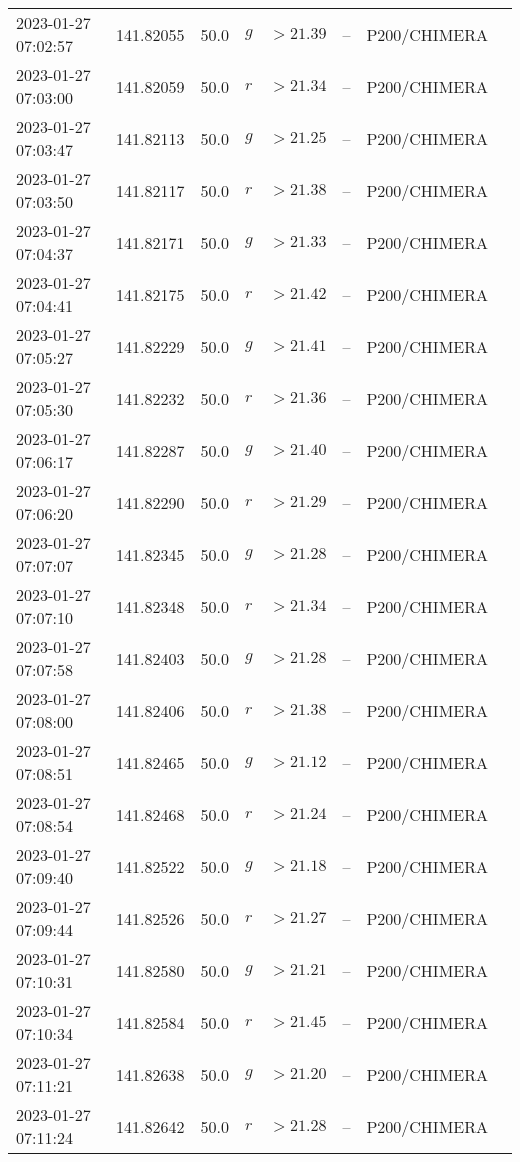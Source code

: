 \documentclass{nature_plusfigure}
\begin{document}
\begin{supplement}
\begin{center}
\begin{longtable}{llllllll}
2023-01-27 07:02:57 & 141.82055 & 50.0 & $g$ & $>21.39$ & -- & P200/CHIMERA &  \\ 
2023-01-27 07:03:00 & 141.82059 & 50.0 & $r$ & $>21.34$ & -- & P200/CHIMERA &  \\ 
2023-01-27 07:03:47 & 141.82113 & 50.0 & $g$ & $>21.25$ & -- & P200/CHIMERA &  \\ 
2023-01-27 07:03:50 & 141.82117 & 50.0 & $r$ & $>21.38$ & -- & P200/CHIMERA &  \\ 
2023-01-27 07:04:37 & 141.82171 & 50.0 & $g$ & $>21.33$ & -- & P200/CHIMERA &  \\ 
2023-01-27 07:04:41 & 141.82175 & 50.0 & $r$ & $>21.42$ & -- & P200/CHIMERA &  \\ 
2023-01-27 07:05:27 & 141.82229 & 50.0 & $g$ & $>21.41$ & -- & P200/CHIMERA &  \\ 
2023-01-27 07:05:30 & 141.82232 & 50.0 & $r$ & $>21.36$ & -- & P200/CHIMERA &  \\ 
2023-01-27 07:06:17 & 141.82287 & 50.0 & $g$ & $>21.40$ & -- & P200/CHIMERA &  \\ 
2023-01-27 07:06:20 & 141.82290 & 50.0 & $r$ & $>21.29$ & -- & P200/CHIMERA &  \\ 
2023-01-27 07:07:07 & 141.82345 & 50.0 & $g$ & $>21.28$ & -- & P200/CHIMERA &  \\ 
2023-01-27 07:07:10 & 141.82348 & 50.0 & $r$ & $>21.34$ & -- & P200/CHIMERA &  \\ 
2023-01-27 07:07:58 & 141.82403 & 50.0 & $g$ & $>21.28$ & -- & P200/CHIMERA &  \\ 
2023-01-27 07:08:00 & 141.82406 & 50.0 & $r$ & $>21.38$ & -- & P200/CHIMERA &  \\ 
2023-01-27 07:08:51 & 141.82465 & 50.0 & $g$ & $>21.12$ & -- & P200/CHIMERA &  \\ 
2023-01-27 07:08:54 & 141.82468 & 50.0 & $r$ & $>21.24$ & -- & P200/CHIMERA &  \\ 
2023-01-27 07:09:40 & 141.82522 & 50.0 & $g$ & $>21.18$ & -- & P200/CHIMERA &  \\ 
2023-01-27 07:09:44 & 141.82526 & 50.0 & $r$ & $>21.27$ & -- & P200/CHIMERA &  \\ 
2023-01-27 07:10:31 & 141.82580 & 50.0 & $g$ & $>21.21$ & -- & P200/CHIMERA &  \\ 
2023-01-27 07:10:34 & 141.82584 & 50.0 & $r$ & $>21.45$ & -- & P200/CHIMERA &  \\ 
2023-01-27 07:11:21 & 141.82638 & 50.0 & $g$ & $>21.20$ & -- & P200/CHIMERA &  \\ 
2023-01-27 07:11:24 & 141.82642 & 50.0 & $r$ & $>21.28$ & -- & P200/CHIMERA &  \\ 

\end{longtable}
\end{center}
\end{supplement}
\end{document}
